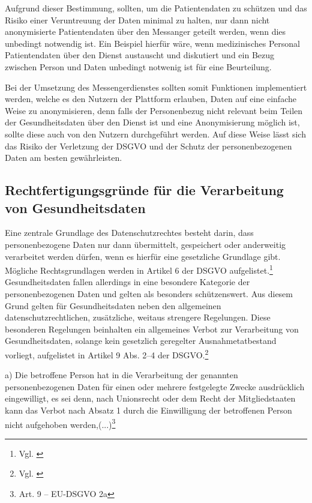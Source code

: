 Aufgrund dieser Bestimmung, sollten, um die Patientendaten zu schützen und das Risiko einer Veruntreuung der Daten minimal zu halten, nur dann nicht anonymisierte Patientendaten über den Messanger geteilt werden, wenn dies unbedingt notwendig ist. Ein Beispiel hierfür wäre, wenn medizinisches Personal Patientendaten über den Dienst austauscht und diskutiert und ein Bezug zwischen Person und Daten unbedingt notwenig ist für eine Beurteilung.

Bei der Umsetzung des Messengerdienstes sollten somit Funktionen implementiert werden, welche es den Nutzern der Plattform erlauben, Daten auf eine einfache Weise zu anonymisieren, denn falls der Personenbezug nicht relevant beim Teilen der Gesundheitsdaten über den Dienst ist und eine Anonymisierung möglich ist, sollte diese auch von den Nutzern durchgeführt werden. Auf diese Weise lässt sich das Risiko der Verletzung der DSGVO und der Schutz der personenbezogenen Daten am besten gewährleisten.

\subsection{Rechtfertigungsgründe für die Verarbeitung von Gesundheitsdaten}\label{subsection:rfdvvg}
Eine zentrale Grundlage des Datenschutzrechtes besteht darin, dass personenbezogene Daten nur dann übermittelt, gespeichert oder anderweitig verarbeitet werden dürfen, wenn es hierfür eine gesetzliche Grundlage gibt. Mögliche Rechtsgrundlagen werden in Artikel 6 der DSGVO aufgelistet.\footnote{Vgl. \cite[S. 5 f.]{Bundesaerztekammer2020}} Gesundheitsdaten fallen allerdings in eine besondere Kategorie der personenbezogenen Daten und gelten als besonders schützenswert. Aus diesem Grund gelten für Gesundheitsdaten neben den allgemeinen datenschutzrechtlichen, zusätzliche, weitaus strengere Regelungen. Diese besonderen Regelungen beinhalten ein allgemeines Verbot zur Verarbeitung von Gesundheitsdaten, solange kein gesetzlich geregelter Ausnahmetatbestand vorliegt, aufgelistet in Artikel 9 Abs. 2–4 der DSGVO.\footnote{Vgl. \cite[S. 20 ff.]{Bundesaerztekammer2020}}

\glqq a) Die betroffene Person hat in die Verarbeitung der genannten personenbezogenen Daten für einen oder mehrere festgelegte Zwecke ausdrücklich eingewilligt, es sei denn, nach Unionsrecht oder dem Recht der Mitgliedstaaten kann das Verbot nach Absatz 1 durch die Einwilligung der betroffenen Person nicht aufgehoben werden,(...)\grqq{}\footnote{Art. 9 – EU-DSGVO 2a}

